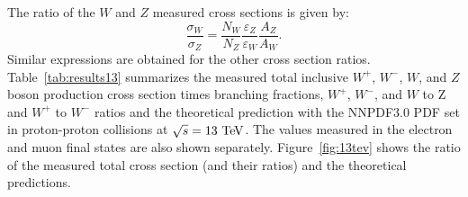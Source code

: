The ratio of the $W$ and $Z$ measured cross sections is given by:
\begin{equation} \label{eq:xsecr}
\frac{\sigma_W}{\sigma_Z} = \frac{N_W}{N_Z}\frac{\varepsilon_Z}{\varepsilon_W}\frac{A_Z}{A_W}.
\end{equation}
Similar expressions are obtained for the other cross section ratios. Table~\ref{tab:results13} summarizes the measured total inclusive $W^+$, $W^-$, $W$, and $Z$ boson production cross section times branching fractions, $W^+$, $W^-$, and $W$ to Z and $W^+$ to $W^-$ ratios and the theoretical prediction with the NNPDF3.0 PDF set in proton-proton collisions at $\sqrt{s}=13~\mathrm{Te\kern -0.1em V}$. The values measured in the electron and muon final states are also shown separately. Figure~\ref{fig:13tev} shows the ratio of the measured total cross section (and their ratios) and the theoretical predictions. 
